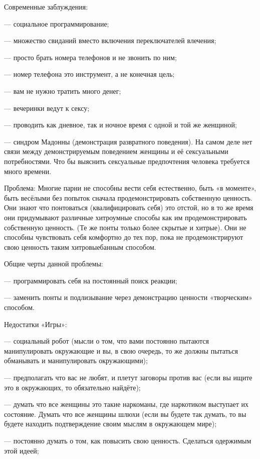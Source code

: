 Современные заблуждения:

--- социальное программирование;

--- множество свиданий вместо включения переключателей влечения;

--- просто брать номера телефонов и не звонить по ним;

--- номер телефона это инструмент, а не конечная цель;

--- вам не нужно тратить много денег;

--- вечеринки ведут к сексу;

--- проводить как дневное, так и ночное время с одной и той же женщиной;

--- синдром Мадонны (демонстрация развратного поведения). На самом деле нет связи между демонстрируемым поведением женщины и её сексуальными потребностями. Что бы выяснить сексуальные предпочтения человека требуется много времени.

Проблема: Многие парни не способны вести себя естественно, быть «в моменте», быть весёлыми без попыток сначала продемонстрировать собственную ценность. Они знают что понтоваться (квалифицировать себя) это отстой, но в то же время они придумывают различные хитроумные способы как им продемонстрировать собственную ценность. (Те же понты только более скрытые и хитрые). Они не способны чувствовать себя комфортно до тех пор, пока не продемонстрируют свою ценность таким хитровыебанным способом.

Общие черты данной проблемы:

--- программировать себя на постоянный поиск реакции;

--- заменить понты и подлизывание через демонстрацию ценности «творческим» способом.

Недостатки «Игры»:

--- социальный робот (мысли о том, что вами постоянно пытаются манипулировать окружающие и вы, в свою очередь, то же должны пытаться обманывать и манипулировать окружающими);

--- предполагать что вас не любят, и плетут заговоры против вас (если вы ищите это в окружающих, то обязательно найдёте);

--- думать что все женщины это такие наркоманы, где наркотиком выступает их состояние. Думать что все женщины шлюхи (если вы будете так думать, то вы будете находить подтверждение своим мыслям в окружающем мире);

--- постоянно думать о том, как повысить свою ценность. Сделаться одержимым этой идеей;

